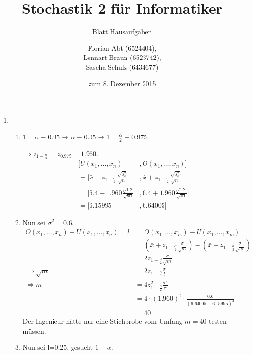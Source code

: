 \documentclass[a4paper]{scrartcl}
\title{Stochastik 2 für Informatiker}
\subtitle{Blatt {\blattnr} Hausaufgaben}
\author{
    Florian Abt (6524404), \\
    Lennart Braun (6523742), \\
    Sascha Schulz (6434677)
}
\date{zum 8. Dezember 2015}
\def \blattnr {8}
\begin{document}
\maketitle

\begin{enumerate}[label=\bfseries \blattnr.\arabic*]

\item 
\begin{enumerate}
 \item 
    $1-\alpha = 0.95 \Rightarrow \alpha = 0.05 \Rightarrow 1-\frac\alpha 2 = 0.975$.
    
    $\Rightarrow z_{1-\frac\alpha 2} = z_{0.975} = 1.960$.
    \begin{equation*}
      \begin{split}
	[U(x_1,\ldots,x_n)&,O(x_1,\ldots,x_n)] \\
	= [\bar{x}-z_{1-\frac\alpha 2} \frac{\sqrt{s_x^2}}{\sqrt{n}} &, \bar{x}+z_{1-\frac\alpha 2} \frac{\sqrt{s_x^2}}{\sqrt{n}}] \\
	= [6.4-1.960 \frac{\sqrt{1.2}}{\sqrt{80}} &, 6.4+1.960 \frac{\sqrt{1.2}}{\sqrt{80}}] \\
	= [6.15995 &, 6.64005]
      \end{split}
    \end{equation*}
 \item 
    Nun sei $\sigma^2=0.6$.    
    \begin{equation*}
      \begin{split}
	O(x_1,\ldots, x_n) - U(x_1,\ldots,x_n) 
	= l 
	&= O(x_1,\ldots, x_m) - U(x_1,\ldots,x_m) \\
	&= \left(\bar{x} + z_{1-\frac\alpha 2}\frac\sigma{\sqrt{m}}\right) - \left(\bar{x} - z_{1-\frac\alpha 2}\frac\sigma{\sqrt{m}}\right) \\
	&= 2z_{1-\frac\alpha 2}\frac\sigma{\sqrt{m}} \\
	\Rightarrow \sqrt{m} &= 2z_{1-\frac\alpha 2}\frac\sigma{l} \\
	\Rightarrow m &= 4z^2_{1-\frac\alpha 2}\frac{\sigma^2}{l^2} \\
	&=4 \cdot (1.960)^2 \cdot \frac{0.6}{(6.64005 - 6.15995)^2} \\
	&=40
      \end{split}
    \end{equation*}
    Der Ingenieur hätte nur eine Stichprobe vom Umfang $m=40$ testen müssen.
 \item 
  Nun sei l=0.25, gesucht $1-\alpha$.
  \begin{equation*}
      \begin{split}

\end{split}
\end{equation*}
\end{enumerate}
\end{enumerate}
\end{document}

